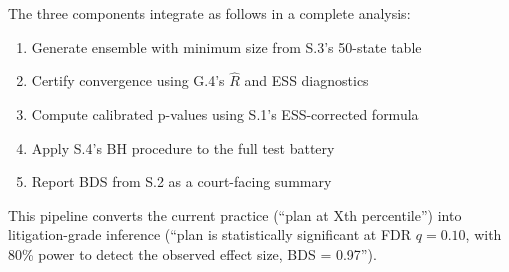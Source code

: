 The three components integrate as follows in a complete analysis:

\begin{enumerate}
\item Generate ensemble with minimum size from S.3's 50-state table
\item Certify convergence using G.4's $\hat{R}$ and ESS diagnostics
\item Compute calibrated p-values using S.1's ESS-corrected formula
\item Apply S.4's BH procedure to the full test battery
\item Report BDS from S.2 as a court-facing summary
\end{enumerate}

This pipeline converts the current practice (``plan at Xth percentile'')
into litigation-grade inference (``plan is statistically significant at
FDR $q = 0.10$, with 80\% power to detect the observed effect size,
BDS = 0.97'').
